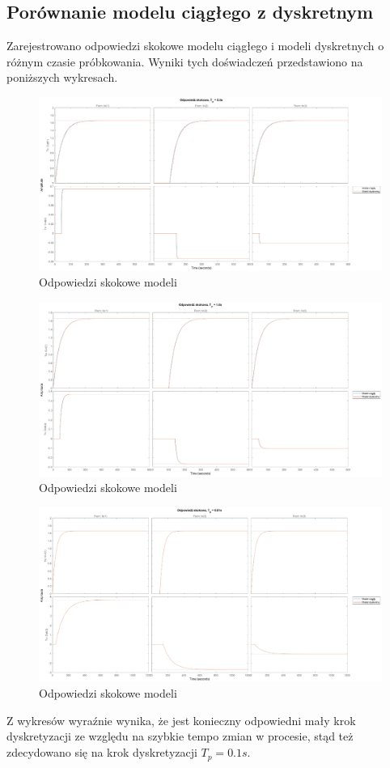 \subsection{Porównanie modelu ciągłego z dyskretnym}

Zarejestrowano odpowiedzi skokowe modelu ciągłego i modeli dyskretnych o różnym czasie próbkowania. Wyniki tych doświadczeń przedstawiono na poniższych wykresach. 

\begin{figure}[H]
    \centering
    \includegraphics[scale=0.35]{images/stepdt5_00.eps}
    \caption{Odpowiedzi skokowe modeli}
\end{figure}

\begin{figure}[H]
    \centering
    \includegraphics[scale=0.35]{images/stepdt1_00.eps}
    \caption{Odpowiedzi skokowe modeli}
\end{figure}

\begin{figure}[H]
    \centering
    \includegraphics[scale=0.35]{images/stepdt0_01.eps}
    \caption{Odpowiedzi skokowe modeli}
\end{figure}

Z wykresów wyraźnie wynika, że jest konieczny odpowiedni mały krok dyskretyzacji ze względu na szybkie tempo zmian w procesie, stąd też zdecydowano się na krok dyskretyzacji $T_p = 0.1s$.